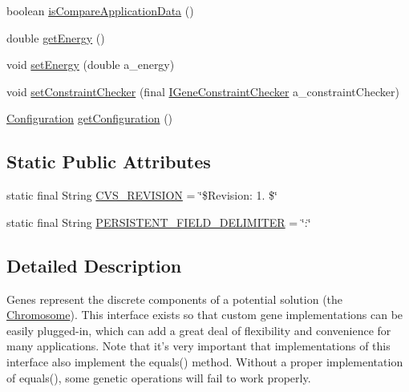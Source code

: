 \begin{DoxyCompactItemize}
\item 
boolean \hyperlink{interfaceorg_1_1jgap_1_1_gene_a71de32c2c6bf2b71332449f20d604f81}{is\-Compare\-Application\-Data} ()
\item 
double \hyperlink{interfaceorg_1_1jgap_1_1_gene_aa1794038b5018cdb49998639c79cb57a}{get\-Energy} ()
\item 
void \hyperlink{interfaceorg_1_1jgap_1_1_gene_af5c429a29c338d2ad5d5514d5beea6e7}{set\-Energy} (double a\-\_\-energy)
\item 
void \hyperlink{interfaceorg_1_1jgap_1_1_gene_a1ef8e9cd912cc68ebe6cd246cf896633}{set\-Constraint\-Checker} (final \hyperlink{interfaceorg_1_1jgap_1_1_i_gene_constraint_checker}{I\-Gene\-Constraint\-Checker} a\-\_\-constraint\-Checker)
\item 
\hyperlink{classorg_1_1jgap_1_1_configuration}{Configuration} \hyperlink{interfaceorg_1_1jgap_1_1_gene_aa178414303649867b6176de80c6ba892}{get\-Configuration} ()
\end{DoxyCompactItemize}
\subsection*{Static Public Attributes}
\begin{DoxyCompactItemize}
\item 
static final String \hyperlink{interfaceorg_1_1jgap_1_1_gene_a771652182ee68c96d4107eee7692fee2}{C\-V\-S\-\_\-\-R\-E\-V\-I\-S\-I\-O\-N} = \char`\"{}\$Revision\-: 1. \$\char`\"{}
\item 
static final String \hyperlink{interfaceorg_1_1jgap_1_1_gene_ae49de1c9f46601f1b60d393a9ce3901a}{P\-E\-R\-S\-I\-S\-T\-E\-N\-T\-\_\-\-F\-I\-E\-L\-D\-\_\-\-D\-E\-L\-I\-M\-I\-T\-E\-R} = \char`\"{}\-:\char`\"{}
\end{DoxyCompactItemize}


\subsection{Detailed Description}
Genes represent the discrete components of a potential solution (the \hyperlink{classorg_1_1jgap_1_1_chromosome}{Chromosome}). This interface exists so that custom gene implementations can be easily plugged-\/in, which can add a great deal of flexibility and convenience for many applications. Note that it's very important that implementations of this interface also implement the equals() method. Without a proper implementation of equals(), some genetic operations will fail to work properly. 

